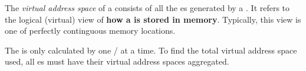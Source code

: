 \begin{definition}\label{def:Virtual_Address_Space}
  The \emph{virtual address space} of a  consists of all the es generated by a .
  It refers to the logical (virtual) view of \textbf{how a  is stored in memory}.
  Typically, this view is one of perfectly continguous memory locations.

  \begin{remark}
    The  is only calculated by one / at a time.
    To find the total virtual address space used, all es must have their virtual address spaces aggregated.
  \end{remark}
\end{definition}


